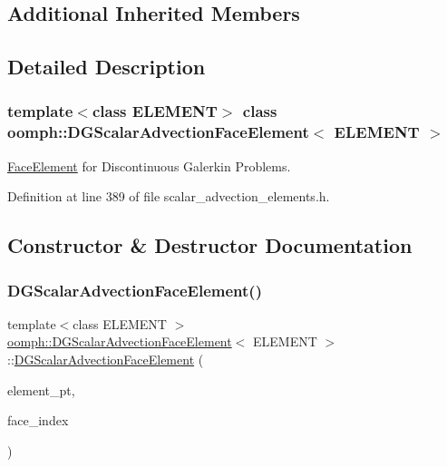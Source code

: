 \subsection*{Additional Inherited Members}


\subsection{Detailed Description}
\subsubsection*{template$<$class E\+L\+E\+M\+E\+NT$>$\newline
class oomph\+::\+D\+G\+Scalar\+Advection\+Face\+Element$<$ E\+L\+E\+M\+E\+N\+T $>$}

\hyperlink{classoomph_1_1FaceElement}{Face\+Element} for Discontinuous Galerkin Problems. 

Definition at line 389 of file scalar\+\_\+advection\+\_\+elements.\+h.



\subsection{Constructor \& Destructor Documentation}
\mbox{\label{classoomph_1_1DGScalarAdvectionFaceElement_aa0af0a27203845c9af1ada1cfab13efb}} 
\subsubsection{\texorpdfstring{D\+G\+Scalar\+Advection\+Face\+Element()}{DGScalarAdvectionFaceElement()}}
{\footnotesize\ttfamily template$<$class E\+L\+E\+M\+E\+NT $>$ \\
\hyperlink{classoomph_1_1DGScalarAdvectionFaceElement}{oomph\+::\+D\+G\+Scalar\+Advection\+Face\+Element}$<$ E\+L\+E\+M\+E\+NT $>$\+::\hyperlink{classoomph_1_1DGScalarAdvectionFaceElement}{D\+G\+Scalar\+Advection\+Face\+Element} (\begin{DoxyParamCaption}\item[{\hyperlink{classoomph_1_1FiniteElement}{Finite\+Element} $\ast$const \&}]{element\+\_\+pt,  }\item[{const int \&}]{face\+\_\+index }\end{DoxyParamCaption})\hspace{0.3cm}{\ttfamily [inline]}}



